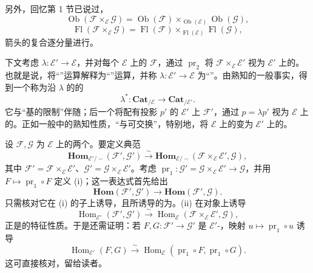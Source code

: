 另外，回忆第 1 节已说过，
\[
 \operatorname{Ob}(\mathcal F\times_{\mathcal E}\mathcal G)
 =\operatorname{Ob}(\mathcal F)\times_{\operatorname{Ob}(\mathcal E)}\operatorname{Ob}(\mathcal G),
\]
\[
 \operatorname{Fl}(\mathcal F\times_{\mathcal E}\mathcal G)
 =\operatorname{Fl}(\mathcal F)\times_{\operatorname{Fl}(\mathcal E)}\operatorname{Fl}(\mathcal G),
\]
箭头的复合逐分量进行。

下文考虑 $\lambda:\mathcal E'\to\mathcal E$，并对每个 $\mathcal E$ 上的 $\mathcal F$，通过 $\operatorname{pr}_2$ 将 $\mathcal F\times_{\mathcal E}\mathcal E'$ 视为 $\mathcal E'$ 上的。也就是说，将“”运算解释为“”运算，并称 $\lambda:\mathcal E'\to\mathcal E$ 为“”。由熟知的一般事实，得到一个称为沿 $\lambda$ 的的
\[
 \lambda^*:\mathbf{Cat}_{/\mathcal E}\longrightarrow\mathbf{Cat}_{/\mathcal E'}.
\]
它与“基的限制”伴随；后一个将配有投影 $p'$ 的 $\mathcal E'$ 上 $\mathcal F'$，通过 $p=\lambda p'$ 视为 $\mathcal E$ 上的。正如一般中的熟知性质，“与可交换”，特别地，将 $\mathcal E$ 上的变为 $\mathcal E'$ 上的。

设 $\mathcal F,\mathcal G$ 为 $\mathcal E$ 上的两个。要定义典范
\[
 \mathbf{Hom}_{\mathcal E'/-}(\mathcal F',\mathcal G')
 \xrightarrow{\sim}\mathbf{Hom}_{\mathcal E/-}(\mathcal F\times_{\mathcal E}\mathcal E',\mathcal G),\tag{i}
\]
其中 $\mathcal F'=\mathcal F\times_{\mathcal E}\mathcal E'$、$\mathcal G'=\mathcal G\times_{\mathcal E}\mathcal E'$。考虑 $\operatorname{pr}_1:\mathcal G'=\mathcal G\times_{\mathcal E}\mathcal E'\to\mathcal G$，并用 $F\mapsto\operatorname{pr}_1\circ F$ 定义 (i)；这一表达式首先给出
\[
 \mathbf{Hom}(\mathcal F',\mathcal G')\longrightarrow\mathbf{Hom}(\mathcal F',\mathcal G).\tag{ii}
\]
只需核对它在 (i) 的子上诱导，且所诱导的为。(ii) 在对象上诱导
\[
 \operatorname{Hom}_{\mathcal E'}(\mathcal F',\mathcal G')\xrightarrow{\sim}
 \operatorname{Hom}_{\mathcal E}(\mathcal F\times_{\mathcal E}\mathcal E',\mathcal G),
\]
正是的特征性质。于是还需证明：若 $F,G:\mathcal F'\to\mathcal G'$ 是 $\mathcal E'$-，映射 $u\mapsto\operatorname{pr}_1\circ u$ 诱导
\[
 \operatorname{Hom}_{\mathcal E'}(F,G)\xrightarrow{\sim}
 \operatorname{Hom}_{\mathcal E}(\operatorname{pr}_1\circ F,\operatorname{pr}_1\circ G).
\]
这可直接核对，留给读者。

